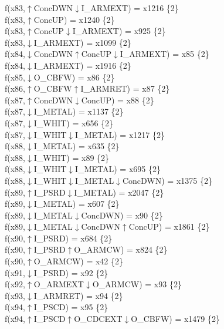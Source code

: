 f(x83,$\uparrow$ConcDWN$\downarrow$I\_ARMEXT) = x1216 \{2\} \\  
f(x83,$\uparrow$ConcUP) = x1240 \{2\} \\  
f(x83,$\uparrow$ConcUP$\downarrow$I\_ARMEXT) = x925 \{2\} \\  
f(x83,$\downarrow$I\_ARMEXT) = x1099 \{2\} \\  
f(x84,$\downarrow$ConcDWN$\uparrow$ConcUP$\downarrow$I\_ARMEXT) = x85 \{2\} \\  
f(x84,$\downarrow$I\_ARMEXT) = x1916 \{2\} \\  
f(x85,$\downarrow$O\_CBFW) = x86 \{2\} \\  
f(x86,$\uparrow$O\_CBFW$\uparrow$I\_ARMRET) = x87 \{2\} \\  
f(x87,$\uparrow$ConcDWN$\downarrow$ConcUP) = x88 \{2\} \\  
f(x87,$\downarrow$I\_METAL) = x1137 \{2\} \\  
f(x87,$\downarrow$I\_WHIT) = x656 \{2\} \\  
f(x87,$\downarrow$I\_WHIT$\downarrow$I\_METAL) = x1217 \{2\} \\  
f(x88,$\downarrow$I\_METAL) = x635 \{2\} \\  
f(x88,$\downarrow$I\_WHIT) = x89 \{2\} \\  
f(x88,$\downarrow$I\_WHIT$\downarrow$I\_METAL) = x695 \{2\} \\  
f(x88,$\downarrow$I\_WHIT$\downarrow$I\_METAL$\downarrow$ConcDWN) = x1375 \{2\} \\  
f(x89,$\uparrow$I\_PSRD$\downarrow$I\_METAL) = x2047 \{2\} \\  
f(x89,$\downarrow$I\_METAL) = x607 \{2\} \\  
f(x89,$\downarrow$I\_METAL$\downarrow$ConcDWN) = x90 \{2\} \\  
f(x89,$\downarrow$I\_METAL$\downarrow$ConcDWN$\uparrow$ConcUP) = x1861 \{2\} \\  
f(x90,$\uparrow$I\_PSRD) = x684 \{2\} \\  
f(x90,$\uparrow$I\_PSRD$\uparrow$O\_ARMCW) = x824 \{2\} \\  
f(x90,$\uparrow$O\_ARMCW) = x42 \{2\} \\  
f(x91,$\downarrow$I\_PSRD) = x92 \{2\} \\  
f(x92,$\uparrow$O\_ARMEXT$\downarrow$O\_ARMCW) = x93 \{2\} \\  
f(x93,$\downarrow$I\_ARMRET) = x94 \{2\} \\  
f(x94,$\uparrow$I\_PSCD) = x95 \{2\} \\  
f(x94,$\uparrow$I\_PSCD$\uparrow$O\_CDCEXT$\downarrow$O\_CBFW) = x1479 \{2\} \\  

